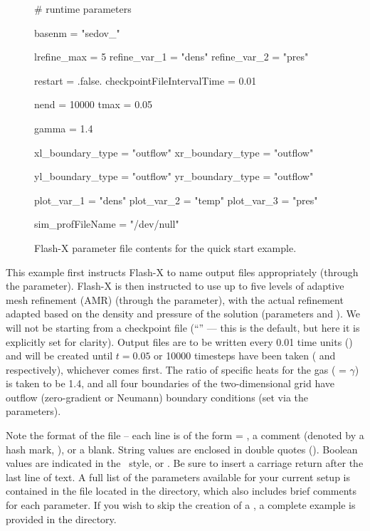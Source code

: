 \begin{figure}[htbp]
\begin{shrink}
\begin{fcodeseg}
# runtime parameters

basenm  = "sedov_"

lrefine_max = 5
refine_var_1 = "dens"
refine_var_2 = "pres"

restart = .false.
checkpointFileIntervalTime = 0.01

nend = 10000
tmax = 0.05

gamma = 1.4

xl_boundary_type = "outflow"
xr_boundary_type = "outflow"

yl_boundary_type = "outflow"
yr_boundary_type = "outflow"

plot_var_1 = "dens"
plot_var_2 = "temp"
plot_var_3 = "pres"

sim_profFileName = "/dev/null"
\end{fcodeseg}
\end{shrink}
\caption{\label{Fig:flash.par} Flash-X parameter file contents for the
quick start example.}
\end{figure}

This example first instructs Flash-X to 
name output files appropriately (through the  parameter).
Flash-X is then instructed to use up to five levels of adaptive
mesh refinement (AMR) (through the  parameter),
with the actual refinement adapted based on the density and pressure of the solution
(parameters  and ). We will
not be starting from a checkpoint file 
(``'' ---
this is the default, but here it is explicitly set for clarity).
Output files are to be written every 0.01 time units
() and will be created until
$t=0.05$ or 10000 timesteps have been taken ( and
 respectively), whichever comes first. The ratio of
specific heats for the gas ( = $\gamma$) is taken to be 1.4, and all
four boundaries of the two-dimensional grid have outflow
(zero-gradient or Neumann) boundary conditions (set via the
 parameters).

Note the format of the file -- each line is of the form
 = , a comment (denoted by a
hash mark, \code{\#}), or a blank.  String values are enclosed in double quotes
(). Boolean values are indicated in the \FORTRAN\ style,
 or . Be sure to insert a carriage return
after the last line of text.  A full list of the parameters available
for your current setup is contained in the file  
located in the  directory, which
also includes brief comments for each parameter.  If you wish to skip
the creation of a , a complete example is provided in
the  directory.

